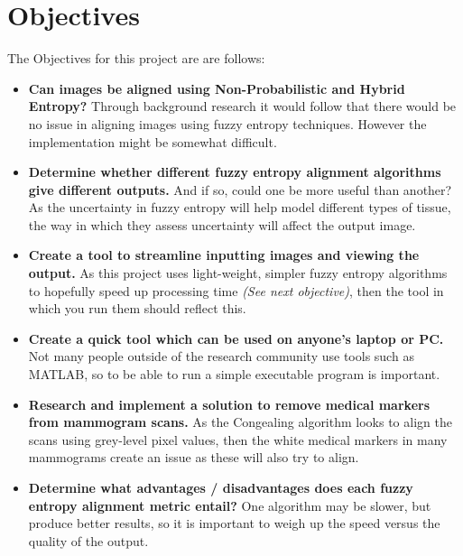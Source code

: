 \section{Objectives}
\label{sec:objectives}

The Objectives for this project are are follows:

\begin{itemize}
  \item \textbf{Can images be aligned using Non-Probabilistic and Hybrid Entropy?} Through background research it would follow that there would be no issue in aligning images using fuzzy entropy techniques. However the implementation might be somewhat difficult.
  \item \textbf{Determine whether different fuzzy entropy alignment algorithms give different outputs.} And if so, could one be more useful than another? As the uncertainty in fuzzy entropy will help model different types of tissue, the way in which they assess uncertainty will affect the output image.
  \item \textbf{Create a tool to streamline inputting images and viewing the output.} As this project uses light-weight, simpler fuzzy entropy algorithms to hopefully speed up processing time \textit{(See next objective)}, then the tool in which you run them should reflect this.
  \item \textbf{Create a quick tool which can be used on anyone's laptop or PC.} Not many people outside of the research community use tools such as MATLAB, so to be able to run a simple executable program is important.
  \item \textbf{Research and implement a solution to remove medical markers from mammogram scans.} As the \Gls{Congealing} algorithm looks to align the scans using grey-level pixel values, then the white medical markers in many mammograms create an issue as these will also try to align.
  \item \textbf{Determine what advantages / disadvantages does each fuzzy entropy alignment metric entail?} One algorithm may be slower, but produce better results, so it is important to weigh up the speed versus the quality of the output.
\end{itemize}
